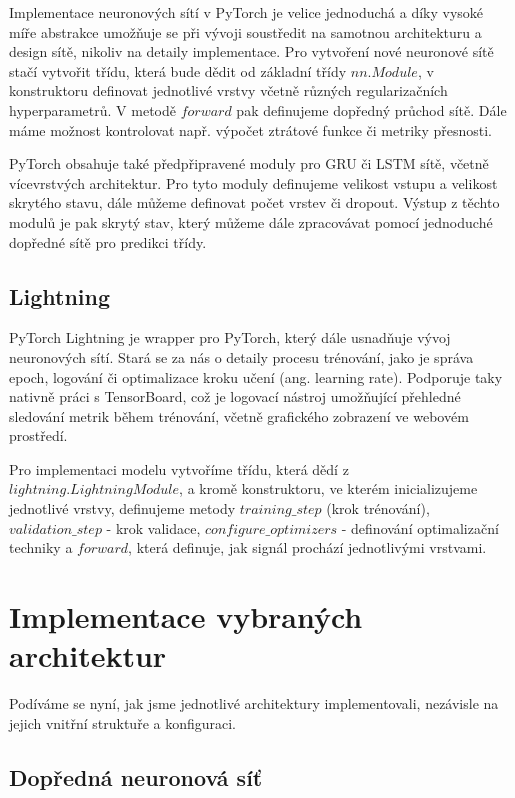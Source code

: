 Implementace neuronových sítí v PyTorch je velice jednoduchá a díky vysoké míře
abstrakce umožňuje se při vývoji soustředit na samotnou architekturu a design
sítě, nikoliv na detaily implementace. Pro vytvoření nové neuronové sítě stačí
vytvořit třídu, která bude dědit od základní třídy $nn.Module$, v konstruktoru
definovat jednotlivé vrstvy včetně různých regularizačních hyperparametrů. V
metodě $forward$ pak definujeme dopředný průchod sítě. Dále máme možnost
kontrolovat např. výpočet ztrátové funkce či metriky přesnosti.

PyTorch obsahuje také předpřipravené moduly pro GRU či LSTM sítě, včetně
vícevrstvých architektur. Pro tyto moduly definujeme velikost vstupu a velikost
skrytého stavu, dále můžeme definovat počet vrstev či dropout. Výstup z těchto
modulů je pak skrytý stav, který můžeme dále zpracovávat pomocí jednoduché
dopředné sítě pro predikci třídy.

\subsection{Lightning}
\label{sec:Lightning}

PyTorch Lightning je wrapper pro PyTorch, který dále usnadňuje vývoj
neuronových sítí. Stará se za nás o detaily procesu trénování, jako je správa
epoch, logování či optimalizace kroku učení (ang. learning rate). Podporuje
taky nativně práci s TensorBoard, což je logovací nástroj umožňující přehledné
sledování metrik během trénování, včetně grafického zobrazení ve webovém
prostředí.

Pro implementaci modelu vytvoříme třídu, která dědí z
$lightning.LightningModule$, a kromě konstruktoru, ve kterém inicializujeme
jednotlivé vrstvy, definujeme metody $training\_step$ (krok trénování),
$validation\_step$ - krok validace, $configure\_optimizers$ - definování
optimalizační techniky a $forward$, která definuje, jak signál prochází
jednotlivými vrstvami.

\section{Implementace vybraných architektur}
\label{sec:SelectedArchitectures}

Podíváme se nyní, jak jsme jednotlivé architektury implementovali, nezávisle na
jejich vnitřní struktuře a konfiguraci.

\subsection{Dopředná neuronová síť}

